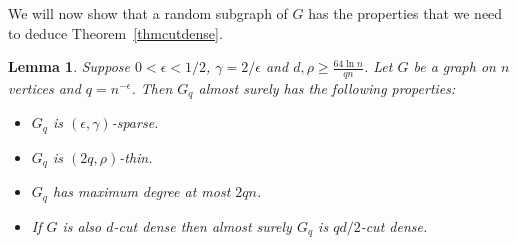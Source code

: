 \documentclass[11pt]{article}
\newtheorem{lemma}[theorem]{Lemma}
\begin{document}
We will now show that a random subgraph of $G$ has the properties that we need to deduce Theorem~\ref{thmcutdense}.

\begin{lemma}\label{gqlem}
Suppose $0< \epsilon<1/2$, $\gamma = 2/\epsilon$ and $d,\rho \geq \frac{64\ln n}{qn}$.  Let $G$ be a graph on $n$ vertices and $q=n^{-\epsilon}$. Then $G_q$ almost surely has the following properties:
\begin{itemize}
\item $G_q$ is  $(\epsilon,\gamma)$-sparse.
\item $G_q$ is $(2q,\rho)$-thin.
\item $G_q$ has maximum degree at most $2qn$.
\item If $G$ is also $d$-cut dense then almost surely $G_q$ is $qd/2$-cut dense.
\end{itemize}
\end{lemma}
\end{document}

